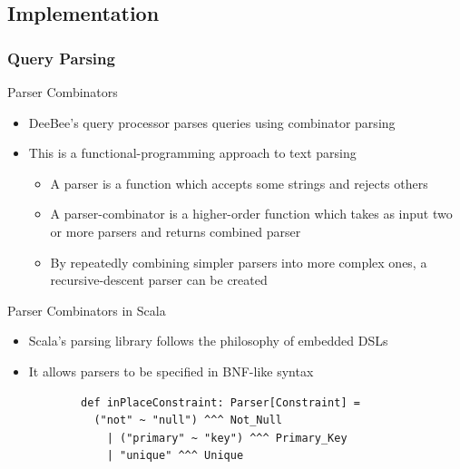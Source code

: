 \documentclass{beamer}
\begin{document}
\subsection{Implementation}
\subsubsection{Query Parsing}
\begin{frame}{Parser Combinators}
  \begin{itemize}
  \item DeeBee's query processor parses queries using \alert{combinator parsing}~\citep{moors2008parser,swierstra2001combinator,fokker1995functional,odersky2008programming}  \pause
  \item This is a functional-programming approach to text parsing  \pause
  \begin{itemize}
    \item A \alert{parser} is a function which accepts some strings and rejects others  \pause
    \item A \alert{parser-combinator} is a higher-order function which takes as input two or more parsers and returns combined parser  \pause
    \item By repeatedly combining simpler parsers into more complex ones, a \alert{recursive-descent parser} can be created  \end{itemize}
  \end{itemize}
\end{frame}

\begin{frame}[fragile]{Parser Combinators in Scala}
  \begin{itemize}
    \item Scala's parsing library follows the philosophy of \alert{embedded DSLs}~\citep{ghosh2010dsls,hofer2008polymorphic,moors2008parser,odersky2008programming}  \pause
    \item It allows parsers to be specified in \alert{BNF-like} syntax  \pause
    \begin{example}
    \begin{verbatim}
        def inPlaceConstraint: Parser[Constraint] = 
          ("not" ~ "null") ^^^ Not_Null
            | ("primary" ~ "key") ^^^ Primary_Key
            | "unique" ^^^ Unique
    \end{verbatim}
    \end{example}

  \end{itemize}
\end{frame}
\end{document}
